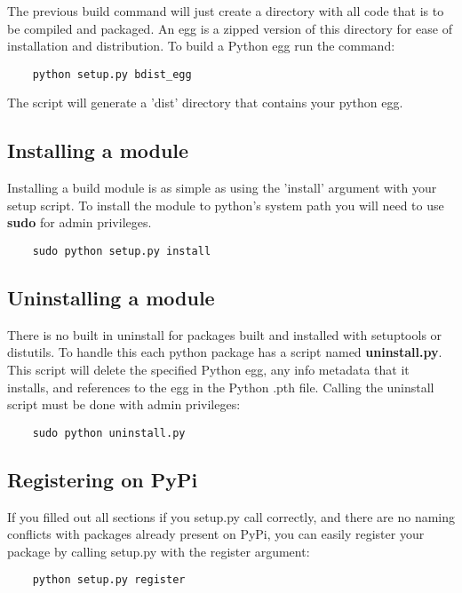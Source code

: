 \documentclass[12pt]{article}
\begin{document}
	The previous build command will just create a directory with all code that is to be compiled and packaged. An egg is a zipped version of this directory for ease of installation and distribution. To build a Python egg run the command:
	
\begin{verbatim}
	python setup.py bdist_egg
\end{verbatim}

The script will generate a 'dist' directory that contains your python egg. 

\subsection*{Installing a module}

	Installing a build module is as simple as using the 'install' argument with your setup script. To install the module to python's system path you will need to use {\bf sudo} for admin privileges.
	
\begin{verbatim}
	sudo python setup.py install
\end{verbatim}


\subsection*{Uninstalling a module}

	There is no built in uninstall for packages built and installed with setuptools or distutils. To handle this each python package has a script named {\bf uninstall.py}. This script will delete the specified Python egg, any info metadata that it installs, and references to the egg in the Python .pth file. Calling the uninstall script must be done with admin privileges:
	
\begin{verbatim}
	sudo python uninstall.py
\end{verbatim}


\subsection*{Registering on PyPi}

	If you filled out all sections if you setup.py call correctly, and there are no naming conflicts with packages already present on PyPi, you can easily register your package by calling setup.py with the register argument:
	
\begin{verbatim}
	python setup.py register
\end{verbatim}
\end{document}

